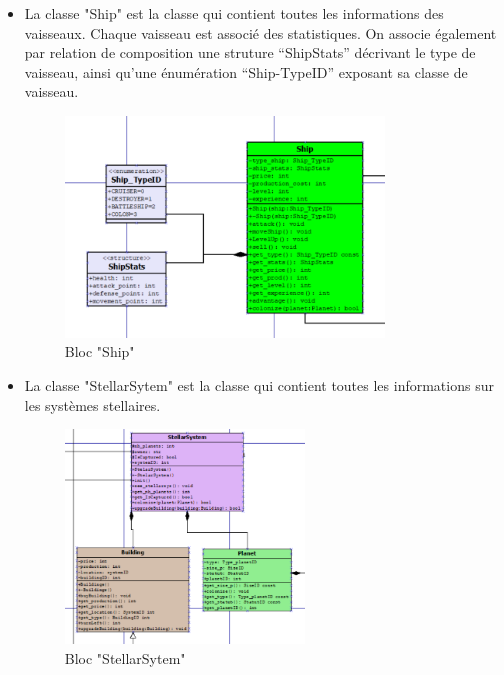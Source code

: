 \begin{itemize}
    \item La classe "Ship" est la classe qui contient toutes les informations des vaisseaux. Chaque vaisseau est associé des statistiques.  On associe
également par relation de composition une struture “ShipStats” décrivant
le type de vaisseau, ainsi qu’une énumération “Ship-TypeID” exposant sa
classe de vaisseau.
\begin{figure}[!h]
\centering
\includegraphics[width=0.8\textwidth]{pics/classe_vaisseau.PNG}
\caption[Bloc "Ship"]{\label{figure_simple}Bloc "Ship"}
\end{figure}

\item La classe "StellarSytem" est la classe qui contient toutes les informations sur les systèmes stellaires. \\

\begin{figure}[!h]
\centering
\includegraphics[width=0.6\textwidth]{pics/classe_system.PNG}
\caption[Bloc "StellarSytem"]{\label{figure_simple}Bloc "StellarSytem"}
\end{figure}


\end{itemize}

